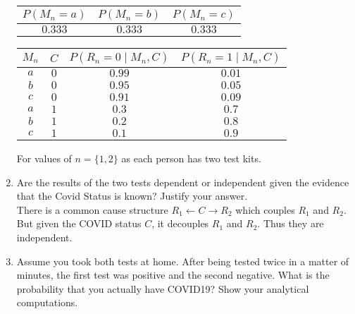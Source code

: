 \begin{enumerate}
        \begin{center}
          \begin{center}
            \bgroup
            \def\arraystretch{1.5}%
            \begin{tabular}{|c|c|c|}
              \hline
              $P(M_n=a)$ & $P(M_n=b)$ & $P(M_n=c)$ \\
              \hline
              $0.333$    & $0.333$    & $0.333$    \\
              \hline
            \end{tabular}
            \egroup
          \end{center}
          \bgroup
          \def\arraystretch{1.5}%
          \begin{tabular}{|cc|c|c|}
            \hline
            $M_n$ & $C$ & $P(R_n=0\mid M_n, C)$ & $P(R_n=1\mid M_n, C)$ \\
            \hline
            $a$   & $0$ & $0.99$                & $0.01$                \\
            \hline
            $b$   & $0$ & $0.95$                & $0.05$                \\
            \hline
            $c$   & $0$ & $0.91$                & $0.09$                \\
            \hline
            $a$   & $1$ & $0.3$                 & $0.7$                 \\
            \hline
            $b$   & $1$ & $0.2$                 & $0.8$                 \\
            \hline
            $c$   & $1$ & $0.1$                 & $0.9$                 \\
            \hline
          \end{tabular}
          \egroup
        \end{center}
        For values of $n = \{1, 2\}$ as each person has two test kits.
  \item Are the results of the two tests dependent or independent given the evidence that the Covid Status is known? Justify your answer.\\[5pt]
        There is a common cause structure $R_1 \leftarrow C \rightarrow R_2$ which couples $R_1$ and $R_2$. But given the COVID status $C$, it decouples $R_1$ and $R_2$. Thus they are independent.
  \item Assume you took both tests at home. After being tested twice in a matter of minutes, the first test was positive and the second negative. What is the probability that you actually have COVID19? Show your analytical computations.\\[5pt]

\end{enumerate}
